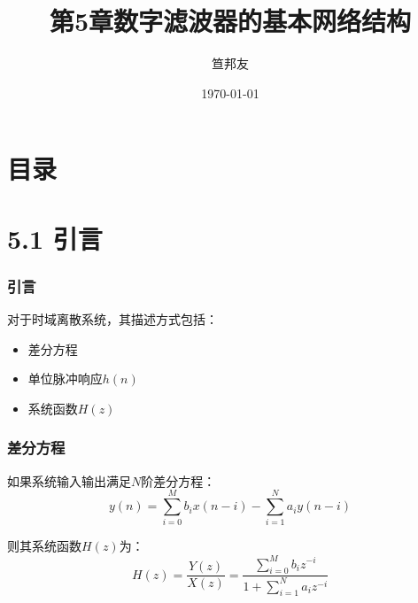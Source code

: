 \documentclass[notheorems,compress,mathserif,table]{beamer}
\title{\heiti 第5章\quad 数字滤波器的基本网络结构}
\author[\textcolor{blue}]{{\sihao\kaishu  笪邦友}}
\institute{\sihao\lishu  \textcolor{violet}{中南民族大学~~ 电子信息工程学院}}
\date{\fangsong\today}
\begin{document}
\kaishu
\frame{ \titlepage }
\section*{目录}



\section{5.1 引言}
\begin{frame}[shrink]\frametitle{引言}
对于时域离散系统，其描述方式包括：
\begin{itemize}
  \item 差分方程
  \item 单位脉冲响应$h(n)$
  \item 系统函数$H(z)$
\end{itemize}
\end{frame}
\begin{frame}\frametitle{差分方程}
如果系统输入输出满足$N$阶差分方程：
$$
y(n)=\sum_{i=0}^{M}b_ix(n-i) - \sum_{i=1}^{N}a_iy(n-i)
$$
\par 则其系统函数$H(z)$为：
$$H(z)=\frac{Y(z)}{X(z)}= \frac{\sum_{i=0}^{M}
b_iz^{-i}}{1+\sum_{i=1}^{N}a_i z^{-i}}$$
\end{frame}
\end{document}
